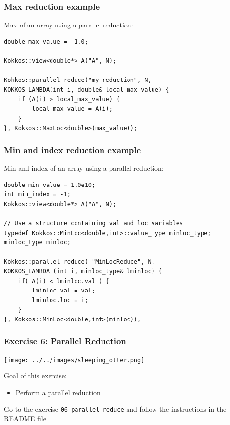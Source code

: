 \documentclass[aspectratio=169]{beamer}
\begin{document}

\begin{frame}[fragile]
    \frametitle{Max reduction example}

Max of an array using a parallel reduction:

\footnotesize
\begin{verbatim}
double max_value = -1.0;

Kokkos::view<double*> A("A", N);

Kokkos::parallel_reduce("my_reduction", N,
KOKKOS_LAMBDA(int i, double& local_max_value) {
    if (A(i) > local_max_value) {
        local_max_value = A(i);
    }
}, Kokkos::MaxLoc<double>(max_value));
\end{verbatim}

\end{frame}


\begin{frame}[fragile]
    \frametitle{Min and index reduction example}

Min and index of an array using a parallel reduction:

\footnotesize
\begin{verbatim}
double min_value = 1.0e10;
int min_index = -1;
Kokkos::view<double*> A("A", N);

// Use a structure containing val and loc variables
typedef Kokkos::MinLoc<double,int>::value_type minloc_type;
minloc_type minloc;

Kokkos::parallel_reduce( "MinLocReduce", N,
KOKKOS_LAMBDA (int i, minloc_type& lminloc) {
    if( A(i) < lminloc.val ) { 
        lminloc.val = val;
        lminloc.loc = i;
    }
}, Kokkos::MinLoc<double,int>(minloc));
\end{verbatim}

\end{frame}


\begin{frame}[fragile]
    \frametitle{Exercise 6: Parallel Reduction} 

    \begin{center}
    \texttt{[image: ../../images/sleeping\_otter.png]}
    \end{center}

    Goal of this exercise:

    \begin{itemize}
        \item Perform a parallel reduction
    \end{itemize}

    \begin{block}{}
        Go to the exercise \texttt{06\_parallel\_reduce} and follow the instructions in the README file
    \end{block}

\end{frame}
\end{document}
